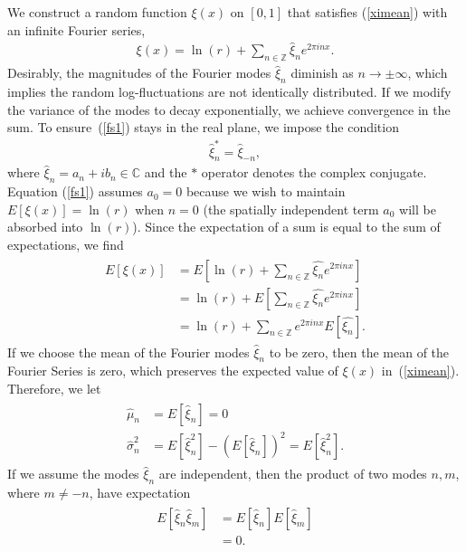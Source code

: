 We construct a random function $\xi(x)$ on $[0,1]$ that satisfies
(\ref{ximean}) with an infinite Fourier series,
\begin{align}\label{fs1}
\xi(x) = \ln(r) + \sum_{n \in \mathbb{Z}}\hat{\xi}_ne^{2\pi inx}.
\end{align}
Desirably, the magnitudes of the Fourier modes $\hat{\xi}_n$ diminish
as $n \to \pm \infty$, which implies the random log-fluctuations are
not identically distributed. If we modify the variance of the modes to
decay exponentially, we achieve convergence in the sum. To ensure~(\ref{fs1}) stays in the real plane, we impose the condition
\begin{align}\label{realcond}
\hat{\xi}_{n}^* = \hat{\xi}_{-n},
\end{align}
where $\hat{\xi}_n=a_n + ib_n \in \mathbb{C}$ and the $*$ operator denotes the complex conjugate. Equation (\ref{fs1}) assumes $a_0=0$
because we wish to maintain $E[\xi(x)]=\ln(r)$ when $n=0$ (the
spatially independent term $a_0$ will be absorbed into $\ln(r)$).
Since the expectation of a sum is equal to the sum of
expectations, we find~\cite{ross}
\begin{align*}
\begin{split}
E[\xi(x)] &= E\left[\ln(r) + \sum_{n \in \mathbb{Z}}\hat{\xi_n}e^{2\pi
  inx}\right]\\
&= \ln(r) + E\left[\sum_{n \in \mathbb{Z}}\hat{\xi_n}e^{2\pi inx}\right]\\
&= \ln(r) + \sum_{n \in \mathbb{Z}}e^{2\pi inx}E[\hat{\xi_n}].
\end{split}
\end{align*}
If we choose the mean of the Fourier modes $\hat{\xi}_n$ to be zero,
then the mean of the Fourier Series is zero, which preserves the expected value of $\xi(x)$ in~(\ref{ximean}). Therefore, we let
\begin{align}
\begin{split}\label{xihatmean}
\hat{\mu}_n&=E[\hat{\xi}_n]=0\\
\hat{\sigma}_n^2&=E[\hat{\xi}_n^2]-(E[\hat{\xi}_n])^2=E[\hat{\xi}_n^2].
\end{split}
\end{align}
If we assume the modes $\hat{\xi}_n$ are independent, then the product of
two modes $n,m$, where $m \neq -n$, have expectation
\begin{align*}
\begin{split}
E[\hat{\xi}_n\hat{\xi}_m]&=E[\hat{\xi}_n]E[\hat{\xi}_m]\\
&=0.
\end{split}
\end{align*}

